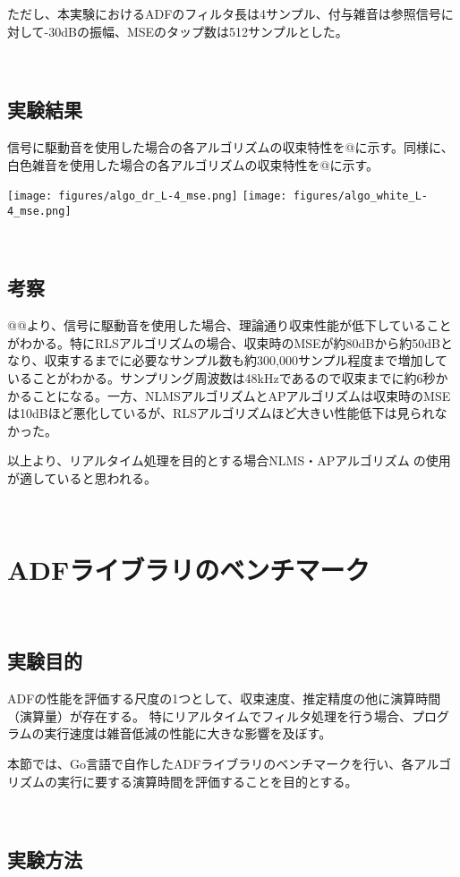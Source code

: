 ただし、本実験におけるADFのフィルタ長は4サンプル、付与雑音は参照信号に対して-30dBの振幅、MSEのタップ数は512サンプルとした。

\
\subsection{実験結果}\label{ux5b9fux9a13ux7d50ux679c-1}

信号に駆動音を使用した場合の各アルゴリズムの収束特性を@に示す。同様に、白色雑音を使用した場合の各アルゴリズムの収束特性を@に示す。

\texttt{[image: figures/algo\_dr\_L-4\_mse.png]}
\texttt{[image: figures/algo\_white\_L-4\_mse.png]}

\
\subsection{考察}\label{ux8003ux5bdf-1}

@@より、信号に駆動音を使用した場合、理論通り収束性能が低下していることがわかる。特にRLSアルゴリズムの場合、収束時のMSEが約80dBから約50dBとなり、収束するまでに必要なサンプル数も約300,000サンプル程度まで増加していることがわかる。サンプリング周波数は48kHzであるので収束までに約6秒かかることになる。一方、NLMSアルゴリズムとAPアルゴリズムは収束時のMSEは10dBほど悪化しているが、RLSアルゴリズムほど大きい性能低下は見られなかった。

以上より、リアルタイム処理を目的とする場合NLMS・APアルゴリズムの使用が適していると思われる。

\
\section{ADFライブラリのベンチマーク}\label{adfux30e9ux30a4ux30d6ux30e9ux30eaux306eux30d9ux30f3ux30c1ux30deux30fcux30af}

\
\subsection{実験目的}\label{ux5b9fux9a13ux76eeux7684-2}

ADFの性能を評価する尺度の1つとして、収束速度、推定精度の他に演算時間（演算量）が存在する。
特にリアルタイムでフィルタ処理を行う場合、プログラムの実行速度は雑音低減の性能に大きな影響を及ぼす。

本節では、Go言語で自作したADFライブラリのベンチマークを行い、各アルゴリズムの実行に要する演算時間を評価することを目的とする。

\
\subsection{実験方法}\label{ux5b9fux9a13ux65b9ux6cd5-2}

